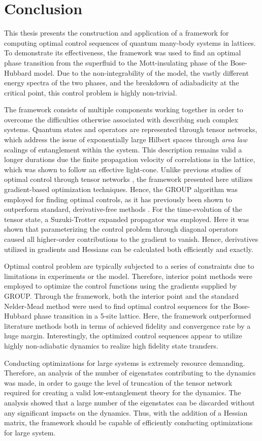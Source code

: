 \chapter{Conclusion}

This thesis presents the construction and application of a framework for computing optimal control sequences of quantum many-body systems in lattices. To demonstrate its effectiveness, the framework was used to find an optimal phase transition from the superfluid to the Mott-insulating phase of the Bose-Hubbard model. Due to the non-integrability of the model, the vastly different energy spectra of the two phases, and the breakdown of adiabadicity at the critical point, this control problem is highly non-trivial.

The framework consists of multiple components working together in order to overcome the difficulties otherwise associated with describing such complex systems. 
Quantum states and operators are represented through tensor networks, which address the issue of exponentially large Hilbert spaces through \textit{area law} scalings of entanglement within the system. 
This description remains valid a longer durations due the finite propagation velocity of correlations in the lattice, which was shown to follow an effective light-cone.
Unlike previous studies of optimal control through tensor networks \cite{Doria2011,FrankBloch}, the framework presented here utilizes gradient-based optimization techniques.
Hence, the GROUP algorithm was employed for finding optimal controls, as it has previously been shown to outperform standard, derivative-free methods \cite{sorensen2018}.
For the time-evolution of the tensor state, a Suzuki-Trotter expanded propagator was employed. Here it was shown that parameterizing the control problem through diagonal operators caused all higher-order contributions to the gradient to vanish. Hence, derivatives utilized in gradients and Hessians can be calculated both efficiently and exactly.

Optimal control problem are typically subjected to a series of constraints due to limitations in experiments or the model. Therefore, interior point methods were employed to optimize the control functions using the gradients supplied by GROUP. 
Through the framework, both the interior point and the standard Nelder-Mead method were used to find optimal control sequences for the Bose-Hubbard phase transition in a 5-site lattice. Here, the framework outperformed literature methods both in terms of achieved fidelity and convergence rate by a huge margin. Interestingly, the optimized control sequences appear to utilize highly non-adiabatic dynamics to realize high fidelity state transfers.

Conducting optimizations for large systems is extremely resource demanding. Therefore, an analysis of the number of eigenstates contributing to the dynamics was made, in order to gauge the level of truncation of the tensor network required for creating a valid low-entanglement theory for the dynamics.
The analysis showed that a large number of the eigenstates can be discarded without any significant impacts on the dynamics.
Thus, with the addition of a Hessian matrix, the framework should be capable of efficiently conducting optimizations for large system.